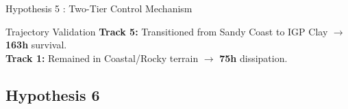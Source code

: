 \documentclass[8pt, aspectratio=169]{beamer}
\begin{document}
\begin{frame}{Hypothesis 5 : Two-Tier Control Mechanism}
    \vspace{-0.1cm}
    \footnotesize
    \begin{exampleblock}{\footnotesize Trajectory Validation}
        \textbf{Track 5:} Transitioned from Sandy Coast to IGP Clay $\rightarrow$ \textbf{163h} survival.\\
        \textbf{Track 1:} Remained in Coastal/Rocky terrain $\rightarrow$ \textbf{75h} dissipation.
    \end{exampleblock}
\end{frame}

\subsection{Hypothesis 6}
\end{document}
